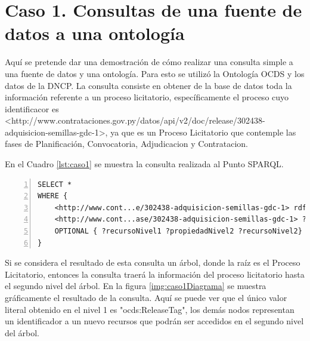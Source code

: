 \section{Caso 1. Consultas de una fuente de datos a una ontología}
\label{section:caso1}


Aquí se pretende dar una demostración de cómo realizar una consulta simple a una fuente de datos y una ontología. Para esto se utilizó la Ontología OCDS y los datos de la DNCP. La consulta consiste en obtener de la base de datos toda la información referente a un proceso licitatorio, específicamente el proceso cuyo identificacor es <http://www.contrataciones.gov.py/datos/api/v2/doc/release/302438-adquisicion-semillas-gdc-1>, ya que es un Proceso Licitatorio que contemple las fases de Planificación, Convocatoria, Adjudicacion y Contratacion.

En el Cuadro \ref{lst:caso1} se muestra la consulta realizada al Punto SPARQL.

\noindent\begin{minipage}[t]{\textwidth}
\begin{lstlisting}[captionpos=b, caption={Tripas referentes al proceso licitatorio cuyo identificador es 302438}, label={lst:caso1},  numbers=left,  numberstyle=\tiny\color{mygray},frame=single]
SELECT *  
WHERE {    	
    <http://www.cont...e/302438-adquisicion-semillas-gdc-1> rdf:type ocds:Release .
    <http://www.cont...ase/302438-adquisicion-semillas-gdc-1> ?propiedadNivel1 ?recursoNivel1 .   
    OPTIONAL { ?recursoNivel1 ?propiedadNivel2 ?recursoNivel2}
}  
 \end{lstlisting}
\end{minipage}

 Si se considera el resultado de esta consulta un árbol, donde la raíz es el Proceso Licitatorio, entonces la consulta traerá la información del proceso licitatorio hasta el segundo nivel del árbol. En la figura \ref{img:caso1Diagrama} se muestra gráficamente el resultado de la consulta. Aquí se puede ver que el único valor literal obtenido en el nivel 1 es "ocds:ReleaseTag", los demás nodos representan un identificador a un nuevo recursos que podrán ser accedidos en el segundo nivel del árbol.
 
